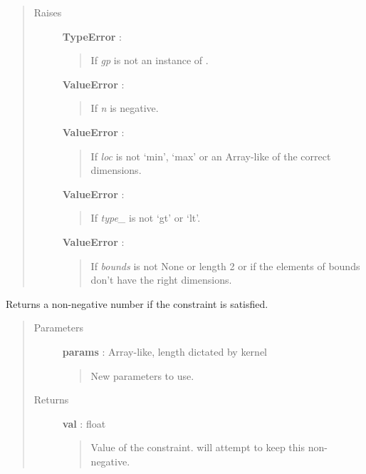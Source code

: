\documentclass[letterpaper,10pt,english]{sphinxmanual}
\begin{document}
\begin{fulllineitems}
\begin{quote}
\begin{description}
\item[{Raises}] \leavevmode
\textbf{TypeError} :
\begin{quote}

If \emph{gp} is not an instance of {\hyperref[gptools:gptools.gaussian_process.GaussianProcess]{}}.
\end{quote}

\textbf{ValueError} :
\begin{quote}

If \emph{n} is negative.
\end{quote}

\textbf{ValueError} :
\begin{quote}

If \emph{loc} is not `min', `max' or an Array-like of the correct dimensions.
\end{quote}

\textbf{ValueError} :
\begin{quote}

If \emph{type\_} is not `gt' or `lt'.
\end{quote}

\textbf{ValueError} :
\begin{quote}

If \emph{bounds} is not None or length 2 or if the elements of bounds don't
have the right dimensions.
\end{quote}

\end{description}\end{quote}

\begin{fulllineitems}
\label{gptools:gptools.gaussian_process.Constraint.__call__}
Returns a non-negative number if the constraint is satisfied.
\begin{quote}\begin{description}
\item[{Parameters}] \leavevmode
\textbf{params} : Array-like, length dictated by kernel
\begin{quote}

New parameters to use.
\end{quote}

\item[{Returns}] \leavevmode
\textbf{val} : float
\begin{quote}

Value of the constraint.  will attempt to keep
this non-negative.
\end{quote}

\end{description}\end{quote}

\end{fulllineitems}


\end{fulllineitems}
\end{document}
